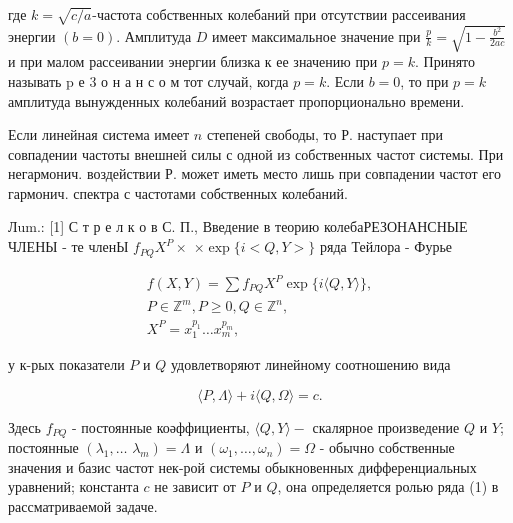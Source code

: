 \documentclass[10pt]{article}
\begin{document}
где $k=\sqrt{c / a}$-частота собственных колебаний при отсутствии рассеивания энергии $(b=0)$. Амплитуда $D$ имеет максимальное значение при $\frac{p}{k}=\sqrt{1-\frac{b^{2}}{2 a c}}$ и при малом рассеивании энергии близка к ее значению при $p=k$. Принято называть $\mathrm{p}$ е 3 о н а н с о м тот случай, когда $p=k$. Если $b=0$, то при $p=k$ амплитуда вынужденных колебаний возрастает пропорционально времени.



Если линейная система имеет $n$ степеней свободы, то Р. наступает при совпадении частоты внешней силы с одной из собственных частот системы. При негармонич. воздействии Р. может иметь место лишь при совпадении частот его гармонич. спектра с частотами собственных колебаний.



Лum.: [1] С т р е л к о в С. П., Введение в теорию колебаРЕЗОНАНСНЫЕ ЧЛЕНЫ - те членЫ $f_{P Q} X^{P} \times$ $\times \exp \{i<Q, Y>\}$ ряда Тейлора - Фурье



\[

\begin{gathered}

f(X, Y)=\sum f_{P Q} X^{P} \exp \{i\langle Q, Y\rangle\}, \\

P \in \mathbb{Z}^{m}, P \geqslant 0, Q \in \mathbb{Z}^{n}, \\

X^{P}=x_{1}^{p_{1}} \ldots x_{m}^{p_{m}},

\end{gathered}

\]



у к-рых показатели $P$ и $Q$ удовлетворяют линейному соотношению вида



\[

\langle P, \Lambda\rangle+i\langle Q, \Omega\rangle=c .

\]



Здесь $f_{P Q}$ - постоянные коәффициенты, $\langle Q, Y\rangle-$ скалярное произведение $Q$ и $Y$; постоянные $\left(\lambda_{1}, \ldots\right.$ $\left.\lambda_{m}\right)=\Lambda$ и $\left(\omega_{1}, \ldots, \omega_{n}\right)=\Omega$ - обычно собственные значения и базис частот нек-рой системы обыкновенных дифференциальных уравнений; константа $c$ не зависит от $P$ и $Q$, она определяется ролью ряда (1) в рассматриваемой задаче.
\end{document}
